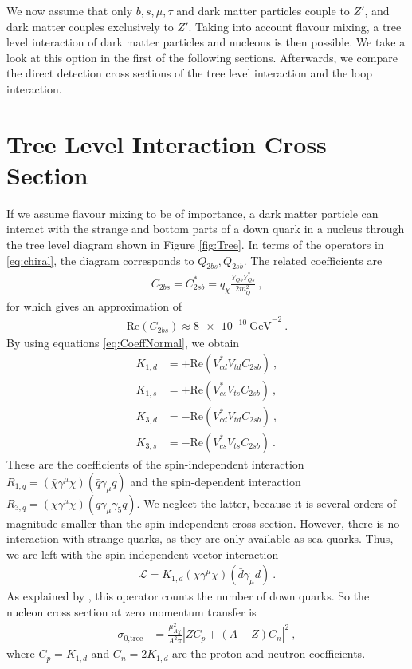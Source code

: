 We now assume that only $b,s,\mu,\tau$ and dark matter particles couple to $Z'$, and dark matter couples exclusively to $Z'$. Taking into account flavour mixing, a tree level interaction of dark matter particles and nucleons is then possible. We take a look at this option in the first of the following sections. Afterwards, we compare the direct detection cross sections of the tree level interaction and the loop interaction.

\section{Tree Level Interaction Cross Section}
If we assume flavour mixing to be of importance, a dark matter particle can interact with the strange and bottom parts of a down quark in a nucleus through the tree level diagram shown in Figure \ref{fig:Tree}. In terms of the operators in \eqref{eq:chiral}, the diagram corresponds to $Q_{2bs},Q_{2sb}$. The related coefficients are
\begin{align*}
	C_{2bs} = C_{2sb}^* = q_\chi\frac{Y_{Qb}Y_{Qs}^*}{2m_Q^2} \ ,
\end{align*}
for which \cite{InColour} gives an approximation of
\begin{align}\label{eq:BoundC}
\text{Re}\left(C_{2bs}\right) \approx \SI{8e-10}{\giga\electronvolt}^{-2} \ .
\end{align}
By using equations \eqref{eq:CoeffNormal}, we obtain
\begin{align*}
	K_{1,d} &= +\text{Re}(V_{cd}^*V_{td}C_{2sb}) \ , \\
	K_{1,s} &= +\text{Re}(V_{cs}^*V_{ts}C_{2sb}) \ , \\
	K_{3,d} &= -\text{Re}(V_{cd}^*V_{td}C_{2sb}) \ , \\
	K_{3,s} &= -\text{Re}(V_{cs}^*V_{ts}C_{2sb}) \ .
\end{align*}
These are the coefficients of the spin-independent interaction $R_{1,q} = (\bar{\chi}\gamma^\mu\chi)(\bar{q}\gamma_\mu q)$ and the spin-dependent interaction $R_{3,q} = (\bar{\chi}\gamma^\mu\chi)(\bar{q}\gamma_\mu\gamma_5 q)$. We neglect the latter, because it is several orders of magnitude smaller than the spin-independent cross section. However, there is no interaction with strange quarks, as they are only available as sea quarks. Thus, we are left with the spin-independent vector interaction
\begin{align*}
	\mathcal{L} = K_{1,d}(\bar{\chi}\gamma^\mu\chi)(\bar{d}\gamma_\mu d) \ .
\end{align*}
As explained by \cite[Chapter 7]{Supersymmetric}, this operator counts the number of down quarks. So the nucleon cross section at zero momentum transfer is
\begin{align}\label{eq:Tree}
	\sigma_\text{0,tree} &= \frac{\mu_{A\chi}^2}{A^2\pi}\left|ZC_p +(A-Z)C_n\right|^2 \ ,
\end{align}
where $C_p = K_{1,d}$ and $C_n = 2K_{1,d}$ are the proton and neutron coefficients.


